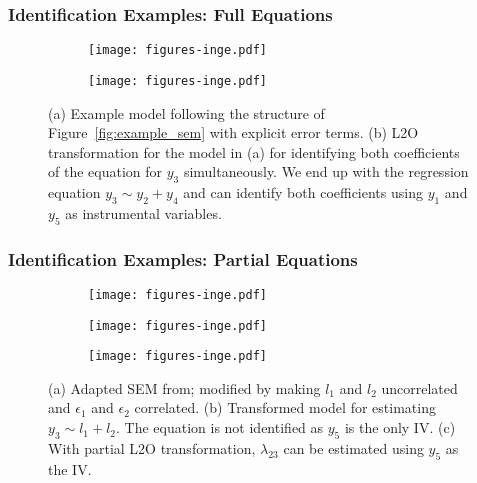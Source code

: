 \documentclass{beamer}
\begin{document}
\begin{frame}
	\frametitle{Identification Examples: Full Equations}
		\begin{figure}[t]
			\begin{subfigure}[b]{0.5 \linewidth}
				\centering
				\texttt{[image: figures-inge.pdf]}
				\caption{}
				\label{fig:transform_example}
			\end{subfigure}%
			\begin{subfigure}[b]{0.5 \linewidth}
				\centering
				\texttt{[image: figures-inge.pdf]}
				\caption{}
				\label{fig:transform_example_single}
			\end{subfigure}
		\caption{(a) Example model following the structure of
			Figure~\ref{fig:example_sem} with explicit error terms. 
			(b) L2O transformation for the model in (a) for identifying both
			coefficients of the equation for $y_3$ simultaneously. We end up with
			the regression equation $y_3 \sim y_2 + y_4$ and can identify both
			coefficients using $y_1$ and $y_5$ as instrumental variables.}
		\label{fig:examples1}
		\end{figure}
\end{frame}

\begin{frame}
	\frametitle{Identification Examples: Partial Equations}
		\begin{figure}[t]
			\centering
			\begin{subfigure}[b]{0.33 \linewidth}
				\centering
				\texttt{[image: figures-inge.pdf]}
				\caption{}
				\label{fig:example_orig}
			\end{subfigure}%
			\begin{subfigure}[b]{0.33 \linewidth}
				\centering
				\texttt{[image: figures-inge.pdf]}
				\caption{}
				\label{fig:example_non_corr}
			\end{subfigure}%
			\begin{subfigure}[b]{0.33 \linewidth}
				\centering
				\texttt{[image: figures-inge.pdf]}
				\caption{}
				\label{fig:transform_non_corr}
			\end{subfigure}
			\caption{(a) Adapted SEM from; modified by making $ l_1
				 $ and $ l_2 $ uncorrelated and $ \epsilon_1 $ and $ \epsilon_2
				 $ correlated. (b) Transformed model for estimating $ y_3 \sim
				 l_1 + l_2 $. The equation is not identified as $ y_5 $ is the
				 only IV. (c) With partial L2O transformation, $ \lambda_{23} $
				 can be estimated using $ y_5 $ as the IV.}
		\label{fig:examples3}
		\end{figure}
\end{frame}
\end{document}
